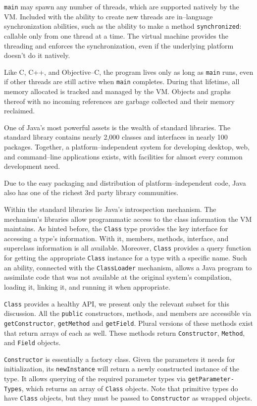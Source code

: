 	\texttt{main} may spawn any number of threads, which are supported natively by the VM.  Included with the ability to create new threads are in--language synchronization abilities, such as the ability to make a method \texttt{synchronized}: callable only from one thread at a time.  The virtual machine provides the threading and enforces the synchronization, even if the underlying platform doesn't do it natively.

	Like C, C++, and Objective--C, the program lives only as long as \texttt{main} runs, even if other threads are still active when \texttt{main} completes.  During that lifetime, all memory allocated is tracked and managed by the VM.  Objects and graphs thereof with no incoming references are garbage collected and their memory reclaimed.

	One of Java's most powerful assets is the wealth of standard libraries.  The standard library contains nearly 2,000 classes and interfaces in nearly 100 packages.  Together, a platform--independent system for developing desktop, web, and command--line applications exists, with facilities for almost every common development need.

	Due to the easy packaging and distribution of platform--independent code, Java also has one of the richest 3rd party library communities.

	Within the standard libraries lie Java's introspection mechanism.  The mechanism's libraries allow programmatic access to the class information the VM maintains.  As hinted before, the \texttt{Class} type provides the key interface for accessing a type's information.  With it, members, methods, interface, and superclass information is all available.  Moreover, \texttt{Class} provides a query function for getting the appropriate \texttt{Class} instance for a type with a specific name.  Such an ability, connected with the \texttt{ClassLoader} mechanism, allows a Java program to assimilate code that was not available at the original system's compilation, loading it, linking it, and running it when appropriate.

	\texttt{Class} provides a healthy API, we present only the relevant subset for this discussion.  All the \texttt{public} constructors, methods, and members are accessible via \texttt{getConstructor}, \texttt{getMethod} and \texttt{getField}.  Plural versions of these methods exist that return arrays of each as well.  These methods return \texttt{Constructor}, \texttt{Method}, and \texttt{Field} objects.

	\texttt{Constructor} is essentially a factory class.  Given the parameters it needs for initialization, its \texttt{newInstance} will return a newly constructed instance of the type.  It allows querying of the required parameter types via \texttt{get\-P\-ar\-am\-et\-er-\-T\-yp\-es}, which returns an array of \texttt{Class} objects.  Note that primitive types do have \texttt{Class} objects, but they must be passed to \texttt{Constructor} as wrapped objects.


